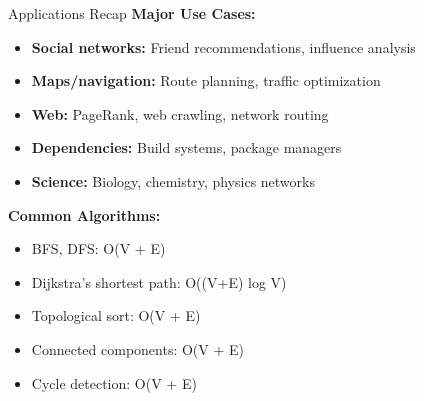 \documentclass[aspectratio=169]{beamer}
\begin{document}
\begin{frame}{Applications Recap}
  \textbf{Major Use Cases:}
  \begin{itemize}
    \item \textbf{Social networks:} Friend recommendations, influence analysis
    \item \textbf{Maps/navigation:} Route planning, traffic optimization
    \item \textbf{Web:} PageRank, web crawling, network routing
    \item \textbf{Dependencies:} Build systems, package managers
    \item \textbf{Science:} Biology, chemistry, physics networks
  \end{itemize}

  \vspace{0.3cm}
  \textbf{Common Algorithms:}
  \begin{itemize}
    \item BFS, DFS: O(V + E)
    \item Dijkstra's shortest path: O((V+E) log V)
    \item Topological sort: O(V + E)
    \item Connected components: O(V + E)
    \item Cycle detection: O(V + E)
  \end{itemize}
\end{frame}
\end{document}

